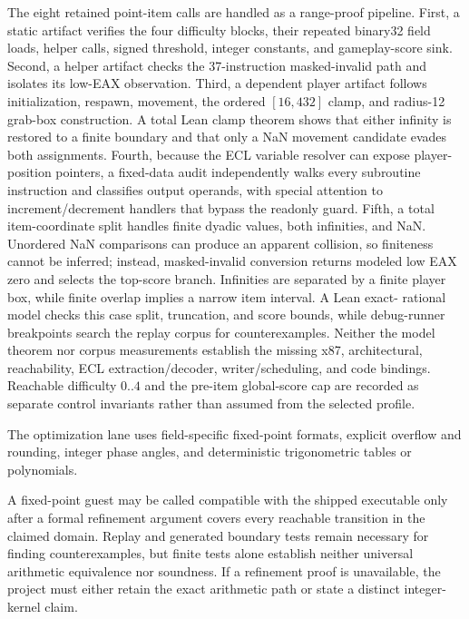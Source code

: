 The eight retained point-item calls are handled as a range-proof pipeline.
First, a static artifact verifies the four difficulty blocks, their repeated
binary32 field loads, helper calls, signed threshold, integer constants, and
gameplay-score sink.  Second, a helper artifact checks the 37-instruction
masked-invalid path and isolates its low-EAX observation.  Third, a dependent
player artifact follows initialization, respawn, movement, the ordered
$[16,432]$ clamp, and radius-12 grab-box construction.  A total Lean clamp
theorem shows that either infinity is restored to a finite boundary and that
only a NaN movement candidate evades both assignments.  Fourth, because the
ECL variable resolver can expose player-position pointers, a fixed-data audit
independently walks every subroutine instruction and classifies output operands,
with special attention to increment/decrement handlers that bypass the readonly
guard.  Fifth, a total item-coordinate split handles finite dyadic values, both
infinities, and NaN.
Unordered NaN comparisons can produce an apparent collision, so finiteness
cannot be inferred; instead, masked-invalid conversion returns modeled low EAX
zero and selects the top-score branch.  Infinities are separated by a finite
player box, while finite overlap implies a narrow item interval.  A Lean exact-
rational model checks this case split, truncation, and score bounds, while
debug-runner breakpoints search the replay corpus for counterexamples.  Neither
the model theorem nor corpus measurements establish the missing x87,
architectural, reachability, ECL extraction/decoder, writer/scheduling, and
code bindings.
Reachable difficulty $0..4$ and the pre-item global-score cap are recorded as
separate control invariants rather than assumed from the selected profile.

The optimization lane uses field-specific fixed-point formats, explicit
overflow and rounding, integer phase angles, and deterministic trigonometric
tables or polynomials.

A fixed-point guest may be called compatible with the shipped executable only
after a formal refinement argument covers every reachable transition in the
claimed domain.  Replay and generated boundary tests remain necessary for
finding counterexamples, but finite tests alone establish neither universal
arithmetic equivalence nor soundness.  If a refinement proof is unavailable,
the project must either retain the exact arithmetic path or state a distinct
integer-kernel claim.
